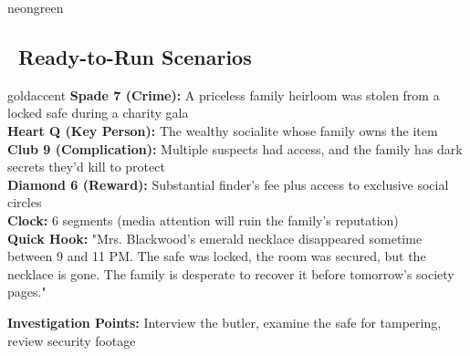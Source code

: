 \documentclass[11pt]{article}
\begin{document}
\newpage

\begin{noirsection}{neongreen}
\subsection*{\faLightbulb\ Ready-to-Run Scenarios}

\begin{casebox}{goldaccent}
\textbf{Spade 7 (Crime):} A priceless family heirloom was stolen from a locked safe during a charity gala\\
\textbf{Heart Q (Key Person):} The wealthy socialite whose family owns the item\\
\textbf{Club 9 (Complication):} Multiple suspects had access, and the family has dark secrets they'd kill to protect\\
\textbf{Diamond 6 (Reward):} Substantial finder's fee plus access to exclusive social circles\\
\textbf{Clock:} 6 segments (media attention will ruin the family's reputation)\\
\textbf{Quick Hook:} "Mrs. Blackwood's emerald necklace disappeared sometime between 9 and 11 PM. The safe was locked, the room was secured, but the necklace is gone. The family is desperate to recover it before tomorrow's society pages."

\textbf{Investigation Points:} Interview the butler, examine the safe for tampering, review security footage
\end{casebox}

\end{noirsection}
\end{document}
